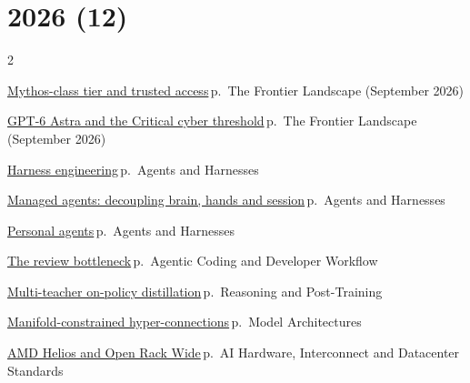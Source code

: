 \documentclass[10pt,a4paper,openany]{report}
\begin{document}
\section{2026 (12)}
\begin{multicols}{2}\small\raggedright
\hyperref[c:landscape-0]{Mythos-class tier and trusted access}\,{\color{muted}\scriptsize p.\,\pageref{c:landscape-0}} {\color{muted}\scriptsize The Frontier Landscape (September 2026)}\par\vspace{2pt}
\hyperref[c:landscape-1]{GPT-6 Astra and the Critical cyber threshold}\,{\color{muted}\scriptsize p.\,\pageref{c:landscape-1}} {\color{muted}\scriptsize The Frontier Landscape (September 2026)}\par\vspace{2pt}
\hyperref[c:agents-1]{Harness engineering}\,{\color{muted}\scriptsize p.\,\pageref{c:agents-1}} {\color{muted}\scriptsize Agents and Harnesses}\par\vspace{2pt}
\hyperref[c:agents-2]{Managed agents: decoupling brain, hands and session}\,{\color{muted}\scriptsize p.\,\pageref{c:agents-2}} {\color{muted}\scriptsize Agents and Harnesses}\par\vspace{2pt}
\hyperref[c:agents-10]{Personal agents}\,{\color{muted}\scriptsize p.\,\pageref{c:agents-10}} {\color{muted}\scriptsize Agents and Harnesses}\par\vspace{2pt}
\hyperref[c:coding-7]{The review bottleneck}\,{\color{muted}\scriptsize p.\,\pageref{c:coding-7}} {\color{muted}\scriptsize Agentic Coding and Developer Workflow}\par\vspace{2pt}
\hyperref[c:reasoning-3]{Multi-teacher on-policy distillation}\,{\color{muted}\scriptsize p.\,\pageref{c:reasoning-3}} {\color{muted}\scriptsize Reasoning and Post-Training}\par\vspace{2pt}
\hyperref[c:arch-3]{Manifold-constrained hyper-connections}\,{\color{muted}\scriptsize p.\,\pageref{c:arch-3}} {\color{muted}\scriptsize Model Architectures}\par\vspace{2pt}
\hyperref[c:hardware-1]{AMD Helios and Open Rack Wide}\,{\color{muted}\scriptsize p.\,\pageref{c:hardware-1}} {\color{muted}\scriptsize AI Hardware, Interconnect and Datacenter Standards}\par\vspace{2pt}

\end{multicols}
\end{document}

